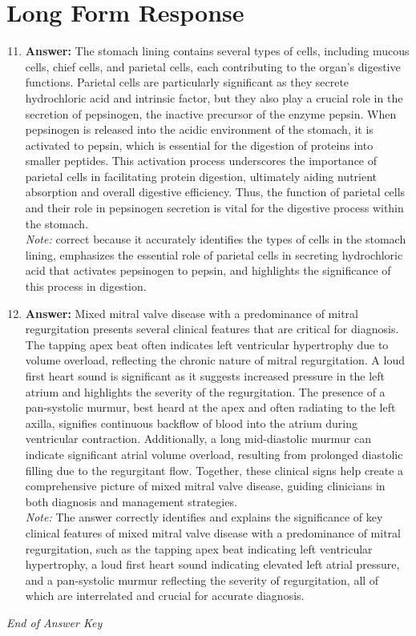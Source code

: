 \documentclass[12pt]{article}
\begin{document}
\section*{Long Form Response}
\begin{enumerate}[label=\arabic*.]
\setcounter{enumi}{10}
\item \textbf{Answer:} The stomach lining contains several types of cells, including mucous cells, chief cells, and parietal cells, each contributing to the organ's digestive functions. Parietal cells are particularly significant as they secrete hydrochloric acid and intrinsic factor, but they also play a crucial role in the secretion of pepsinogen, the inactive precursor of the enzyme pepsin. When pepsinogen is released into the acidic environment of the stomach, it is activated to pepsin, which is essential for the digestion of proteins into smaller peptides. This activation process underscores the importance of parietal cells in facilitating protein digestion, ultimately aiding nutrient absorption and overall digestive efficiency. Thus, the function of parietal cells and their role in pepsinogen secretion is vital for the digestive process within the stomach.
\\ \textit{Note:} correct because it accurately identifies the types of cells in the stomach lining, emphasizes the essential role of parietal cells in secreting hydrochloric acid that activates pepsinogen to pepsin, and highlights the significance of this process in digestion.
\item \textbf{Answer:} Mixed mitral valve disease with a predominance of mitral regurgitation presents several clinical features that are critical for diagnosis. The tapping apex beat often indicates left ventricular hypertrophy due to volume overload, reflecting the chronic nature of mitral regurgitation. A loud first heart sound is significant as it suggests increased pressure in the left atrium and highlights the severity of the regurgitation. The presence of a pan-systolic murmur, best heard at the apex and often radiating to the left axilla, signifies continuous backflow of blood into the atrium during ventricular contraction. Additionally, a long mid-diastolic murmur can indicate significant atrial volume overload, resulting from prolonged diastolic filling due to the regurgitant flow. Together, these clinical signs help create a comprehensive picture of mixed mitral valve disease, guiding clinicians in both diagnosis and management strategies.
\\ \textit{Note:} The answer correctly identifies and explains the significance of key clinical features of mixed mitral valve disease with a predominance of mitral regurgitation, such as the tapping apex beat indicating left ventricular hypertrophy, a loud first heart sound indicating elevated left atrial pressure, and a pan-systolic murmur reflecting the severity of regurgitation, all of which are interrelated and crucial for accurate diagnosis.
\end{enumerate}

\vfill
\noindent\textit{End of Answer Key}
\end{document}
